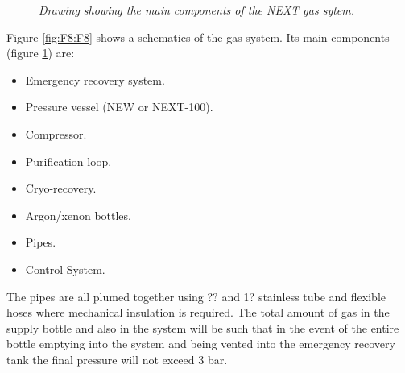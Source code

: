 \begin{figure}[hpt!]
    \bigskip
    \begin{center}\leavevmode
        \caption{\textit{Drawing showing the main components of the NEXT gas sytem.}}
        \label{fig.gas2}
    \end{center}
\end{figure}

Figure \ref{fig:F8:F8} shows a schematics of the gas system. Its main components (figure \ref{fig.gas2}) are:  

\begin{itemize}
\item Emergency recovery system.
\item Pressure vessel (NEW or NEXT-100). 
\item Compressor.
\item Purification loop.
\item Cryo-recovery.
\item Argon/xenon bottles.
\item Pipes.
\item Control System.
\end{itemize}

The pipes are all plumed together using ?? and 1? stainless tube and flexible hoses where mechanical insulation is required. The total amount of gas in the supply bottle and also in the system will be such that in the event of the entire bottle emptying into the system and being vented into the emergency recovery tank the final pressure will not exceed 3 bar.


